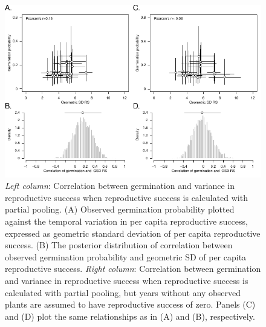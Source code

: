 \documentclass[12pt, oneside, titlepage]{article}   	%
\begin{document}
{ \begin{figure}
\centering
       \includegraphics[page=1,width=1\textwidth]{../manuscript/figures/analysis-figure.pdf}  
 \caption{ \textit{Left column}: Correlation between germination and variance in reproductive success when reproductive success is calculated with partial pooling. (A) Observed germination probability plotted against the temporal variation in per capita reproductive success, expressed as geometric standard deviation of per capita reproductive success. (B) The posterior distribution of correlation between observed germination probability and geometric SD of per capita reproductive success. \textit{Right column}: Correlation between germination and variance in reproductive success when reproductive success is calculated with partial pooling, but years without any observed plants are assumed to have reproductive success of zero. Panels (C) and (D) plot the same relationships as in (A) and (B), respectively.}
   \label{fig:obs-pred}
 \end{figure}

}
\end{document}

